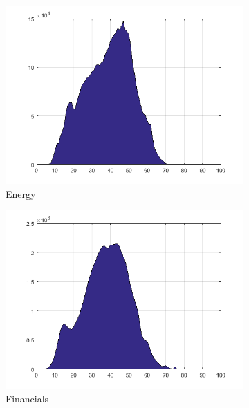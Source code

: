 \documentclass[11pt,a4,twosided,singlespacing,titlepagenumber=on]{scrreprt}
\numberwithin{equation}{chapter} %
\theoremstyle{remark}
\begin{document}
\begin{figure}[H]
\begin{subfigure}[t]{0.23\textwidth}
        \includegraphics[width=1\textwidth]{quad/3}
        \caption{Energy}
    \end{subfigure}
    \begin{subfigure}[t]{0.23\textwidth}
        \centering
        \includegraphics[width=1\textwidth]{quad/4}
        \caption{Financials}
    \end{subfigure}
    \begin{subfigure}[t]{0.23\textwidth}
        \centering

\end{subfigure}
\end{figure}
\end{document}
